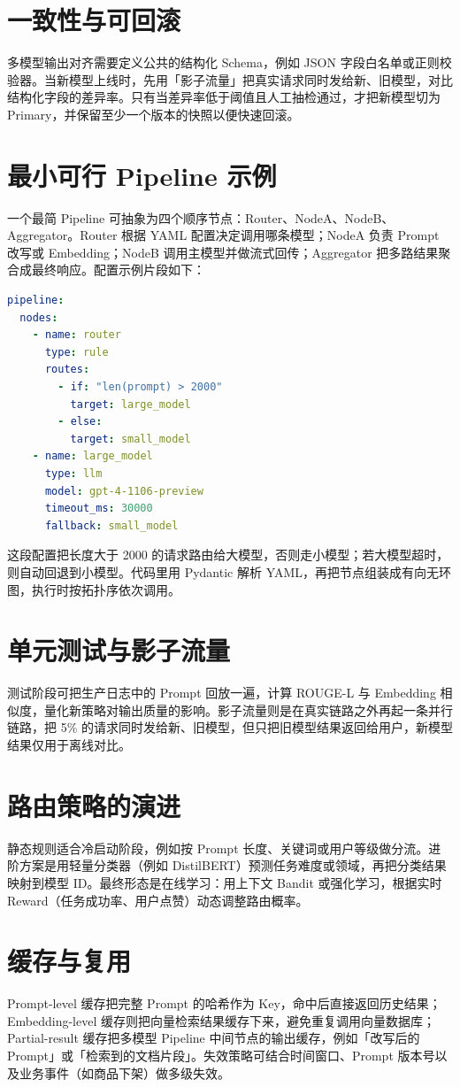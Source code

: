 \chapter{一致性与可回滚}
多模型输出对齐需要定义公共的结构化 Schema，例如 JSON 字段白名单或正则校验器。当新模型上线时，先用「影子流量」把真实请求同时发给新、旧模型，对比结构化字段的差异率。只有当差异率低于阈值且人工抽检通过，才把新模型切为 Primary，并保留至少一个版本的快照以便快速回滚。\par
\chapter{最小可行 Pipeline 示例}
一个最简 Pipeline 可抽象为四个顺序节点：Router、NodeA、NodeB、Aggregator。Router 根据 YAML 配置决定调用哪条模型；NodeA 负责 Prompt 改写或 Embedding；NodeB 调用主模型并做流式回传；Aggregator 把多路结果聚合成最终响应。配置示例片段如下：\par
\begin{lstlisting}[language=yaml]
pipeline:
  nodes:
    - name: router
      type: rule
      routes:
        - if: "len(prompt) > 2000"
          target: large_model
        - else:
          target: small_model
    - name: large_model
      type: llm
      model: gpt-4-1106-preview
      timeout_ms: 30000
      fallback: small_model
\end{lstlisting}
这段配置把长度大于 2000 的请求路由给大模型，否则走小模型；若大模型超时，则自动回退到小模型。代码里用 Pydantic 解析 YAML，再把节点组装成有向无环图，执行时按拓扑序依次调用。\par
\chapter{单元测试与影子流量}
测试阶段可把生产日志中的 Prompt 回放一遍，计算 ROUGE-L 与 Embedding 相似度，量化新策略对输出质量的影响。影子流量则是在真实链路之外再起一条并行链路，把 5\%{} 的请求同时发给新、旧模型，但只把旧模型结果返回给用户，新模型结果仅用于离线对比。\par
\chapter{路由策略的演进}
静态规则适合冷启动阶段，例如按 Prompt 长度、关键词或用户等级做分流。进阶方案是用轻量分类器（例如 DistilBERT）预测任务难度或领域，再把分类结果映射到模型 ID。最终形态是在线学习：用上下文 Bandit 或强化学习，根据实时 Reward（任务成功率、用户点赞）动态调整路由概率。\par
\chapter{缓存与复用}
Prompt-level 缓存把完整 Prompt 的哈希作为 Key，命中后直接返回历史结果；Embedding-level 缓存则把向量检索结果缓存下来，避免重复调用向量数据库；Partial-result 缓存把多模型 Pipeline 中间节点的输出缓存，例如「改写后的 Prompt」或「检索到的文档片段」。失效策略可结合时间窗口、Prompt 版本号以及业务事件（如商品下架）做多级失效。\par
